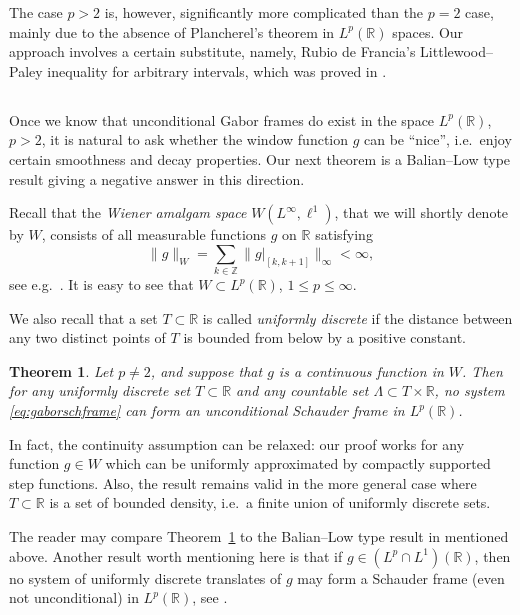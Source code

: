 \documentclass[reqno,a4paper,12pt]{amsart}
\numberwithin{equation}{section}
\numberwithin{figure}{section}
\newcommand\R{\mathbb{R}}
\newcommand\Z{\mathbb{Z}}
\newcommand\Lam{\Lambda}
\newcommand\1{\mathds{1}}
\newcommand{\TTT}{T}
\renewcommand\le{\leqslant}
\newcommand\sbt{\subset}
\theoremstyle{plain}
\newtheorem{thm}{Theorem}[section]
\newcommand{\thmref}[1]{Theorem~\ref{#1}}
\theoremstyle{definition}
\begin{document}
The case $p > 2$ is, however, significantly more complicated than the  $p=2$ case, mainly due to the absence of Plancherel's theorem in $L^p(\R)$ spaces. Our approach involves a certain substitute, namely, Rubio de Francia's Littlewood--Paley inequality for arbitrary intervals, which was proved in \cite{Rub85}. 


\subsection{}
Once we know that unconditional Gabor frames do exist in the space $L^p(\R)$, $p > 2$, it is natural to ask whether the window function $g$ can be ``nice'', i.e.\ enjoy certain smoothness and decay properties. Our next theorem is a Balian--Low type result giving a negative answer in this direction.

Recall that the \emph{Wiener amalgam space} $W(L^\infty, \ell^1)$, that
we will shortly denote by $W$, consists of all measurable
functions $g$ on $\R$ satisfying
\begin{equation}
\label{eq:amalgam}
\|g\|_W =\sum_{k\in\Z} \|g|_{[k,k+1]}\|_{\infty} < \infty,
\end{equation}
see e.g.\ \cite[Section 11.4]{Hei11}.
It is easy to see that $W \subset L^p(\R)$, $1\le p\le\infty$.

We also recall that a set $\TTT\subset\R$ is called 
\emph{uniformly discrete} if the distance between 
any two distinct points of $\TTT$ is bounded from 
below by a positive constant.

\begin{thm}
\label{thm:nicegen}
Let $p \ne 2 $, and suppose that $g$ is a continuous function in $W$. 
Then for any uniformly discrete set $\TTT\subset \R$ and any 
countable set $\Lam \sbt \TTT\times \R$, 
no system \eqref{eq:gaborschframe} can form 
an unconditional Schauder frame in $L^p(\R)$.
\end{thm}

In fact, the continuity assumption can be relaxed:
our proof works for any function $g\in W$
which can be uniformly approximated by compactly supported
step functions. Also, the result remains valid in the more general case where 
$\TTT \sbt \R$ is a set of bounded density, i.e.\ a finite union of uniformly discrete sets.




The reader may compare \thmref{thm:nicegen} to the Balian--Low type result 
in \cite[Theorem 11.33]{Hei11} mentioned above. Another result worth mentioning here is that if $g\in (L^p \cap L^1)(\R)$, then no system of uniformly discrete translates of $g$ may form a Schauder frame (even not unconditional) in $L^p(\R)$, see \cite[Proposition 2.2]{OSSZ11}.
\end{document}
